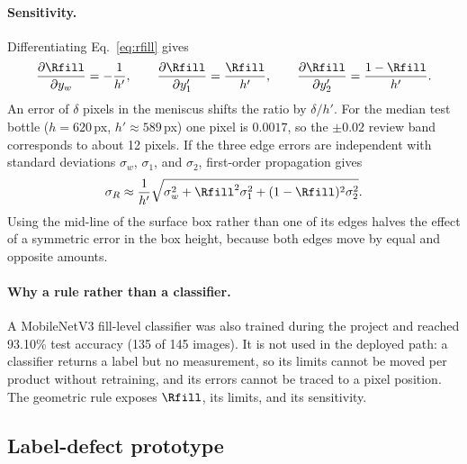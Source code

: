 \paragraph{Sensitivity.} Differentiating Eq.~\eqref{eq:rfill} gives
\begin{equation}
    \frac{\partial \Rfill}{\partial y_w} = -\frac{1}{h'},\qquad
    \frac{\partial \Rfill}{\partial y'_1} = \frac{\Rfill}{h'},\qquad
    \frac{\partial \Rfill}{\partial y'_2} = \frac{1-\Rfill}{h'}.
    \label{eq:sens}
\end{equation}
An error of $\delta$ pixels in the meniscus shifts the ratio by $\delta/h'$. For the median test bottle ($h=620$\,px, $h'\approx589$\,px) one pixel is $0.0017$, so the $\pm0.02$ review band corresponds to about 12 pixels. If the three edge errors are independent with standard deviations $\sigma_w$, $\sigma_1$, and $\sigma_2$, first-order propagation gives
\begin{equation}
    \sigma_R \approx \frac{1}{h'}\sqrt{\sigma_w^2 + \Rfill^2\sigma_1^2 + (1-\Rfill)^2\sigma_2^2}.
    \label{eq:prop}
\end{equation}
Using the mid-line of the surface box rather than one of its edges halves the effect of a symmetric error in the box height, because both edges move by equal and opposite amounts.

\paragraph{Why a rule rather than a classifier.} A MobileNetV3 fill-level classifier was also trained during the project and reached 93.10\% test accuracy (135 of 145 images). It is not used in the deployed path: a classifier returns a label but no measurement, so its limits cannot be moved per product without retraining, and its errors cannot be traced to a pixel position. The geometric rule exposes $\Rfill$, its limits, and its sensitivity.

\subsection{Label-defect prototype}
\label{sec:label-impl}

